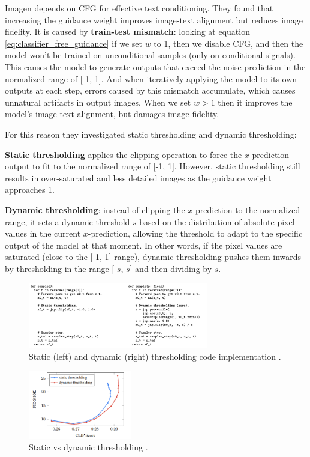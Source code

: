 Imagen depends on CFG for effective text conditioning. They found that increasing the guidance weight improves image-text alignment but reduces image fidelity. It is caused by \textbf{train-test mismatch}: looking at equation \ref{eq:classifier_free_guidance} if we set $w$ to 1, then we disable CFG, and then the model won't be trained on unconditional samples (only on conditional signals). This causes the model to generate outputs that exceed the noise prediction in the normalized range of [-1, 1]. And when iteratively applying the model to its own outputs at each step, errors caused by this mismatch accumulate, which causes unnatural artifacts in output images. When we set $w>1$ then it improves the model's image-text alignment, but damages image fidelity.

For this reason they investigated static thresholding and dynamic thresholding:

\textbf{Static thresholding} applies the clipping operation to force the $x$-prediction output to fit to the normalized range of [-1, 1]. However, static thresholding still results in over-saturated and less detailed images as the guidance weight approaches 1.

\textbf{Dynamic thresholding}: instead of clipping the $x$-prediction to the normalized range, it sets a dynamic threshold $s$ based on the distribution of absolute pixel values in the current $x$-prediction, allowing the threshold to adapt to the specific output of the model at that moment. In other words, if the pixel values are saturated (close to the [-1, 1] range), dynamic thresholding pushes them inwards by thresholding in the range [-$s$, $s$] and then dividing by $s$.

\begin{figure}
    \centering
    \includegraphics[width=0.7\textwidth]{images/imagen/static_dynamic_thresholding.png}
    \caption{Static (left) and dynamic (right) thresholding code implementation \cite{imagen}.}
    \label{fig:imagen_dynamic_thresholding}
\end{figure}

\begin{figure}
    \centering
    \includegraphics[width=0.4\textwidth]{images/imagen/static_vs_dynamic_thresholding.png}
    \caption{Static vs dynamic thresholding \cite{imagen}.}
    \label{fig:imagen_static_vs_dynamic_thresholding}
\end{figure}

